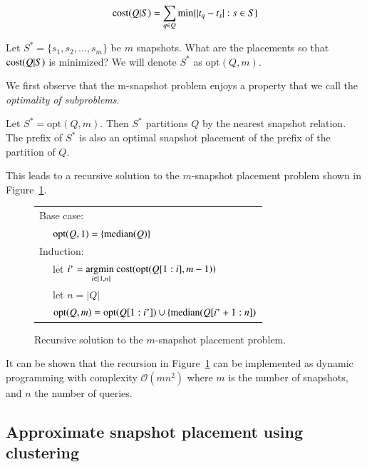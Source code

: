 $$ \mathrm{cost}(Q|S) = \sum_{q\in Q} \min\{|t_q - t_s| : s\in S\} $$

\begin{definition}
    Let $S^* = \{s_1, s_2, \dots, s_m\}$ be $m$ snapshots.  What
    are the placements so that $\mathrm{cost}(Q|S)$ is minimized?
    We will denote $S^*$ as $\mathrm{opt}(Q, m)$.
\end{definition}

We first observe that the m-snapshot problem enjoys a property that we call the
{\em optimality of subproblems}.

\begin{theorem}
    Let $S^* = \mathrm{opt}(Q, m)$.  Then $S^*$ partitions $Q$ by the nearest
    snapshot relation.  The prefix of $S^*$ is also an optimal snapshot
    placement of the prefix of the partition of $Q$.
    \label{thm:subproblem}
\end{theorem}

This leads to a recursive solution to the $m$-snapshot
placement problem shown in Figure~\ref{fig:recursion}.

\begin{figure}[htbp]
    \centering
    \begin{tabular}{l} \hline \hline
        Base case: \\
        \verb|  | $\mathrm{opt}(Q, 1) = \{\mathrm{median}(Q)\}$ \\ \hline
        Induction: \\
        \verb|  | let $i^* = \underset{i\in[1,n]}{\mathrm{argmin}\ } \mathrm{cost}(\mathrm{opt}(Q[1:i], m-1))$ \\
        \verb|  | let $n = |Q|$ \\
        \verb|  | $\mathrm{opt}(Q, m) = \mathrm{opt}(Q[1:i^*]) \cup \{\mathrm{median}(Q[i^*+1:n])$ \\
        \hline \hline
    \end{tabular}
    \caption{Recursive solution to the $m$-snapshot placement problem.}
    \label{fig:recursion}
\end{figure}

It can be shown that the recursion in Figure~\ref{fig:recursion} can be
implemented as dynamic programming with complexity $\mathcal{O}(mn^2)$
where $m$ is the number of snapshots, and $n$ the number of queries.

\subsection{Approximate snapshot placement using clustering}

